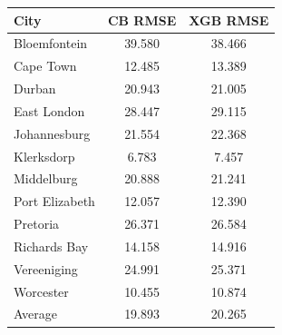 \begin{tabular}{lcc}
\toprule
City & CB RMSE & XGB RMSE \\ \midrule
Bloemfontein & 39.580 & 38.466 \\
Cape Town & 12.485 & 13.389 \\
Durban & 20.943 & 21.005 \\
East London & 28.447 & 29.115 \\
Johannesburg & 21.554 & 22.368 \\
Klerksdorp & 6.783 & 7.457 \\
Middelburg & 20.888 & 21.241 \\
Port Elizabeth & 12.057 & 12.390 \\
Pretoria & 26.371 & 26.584 \\
Richards Bay & 14.158 & 14.916 \\
Vereeniging & 24.991 & 25.371 \\
Worcester & 10.455 & 10.874 \\
Average & 19.893 & 20.265 \\
\bottomrule
\end{tabular}
